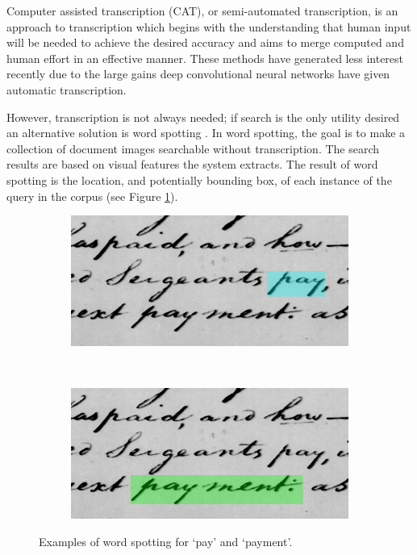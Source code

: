 \documentclass[ms,electronic,twosidetoc,letterpaper,chaptercenter,parttop,lof,lot]{byumsphd}
\begin{document}
Computer assisted transcription (CAT), or semi-automated transcription, is an approach to transcription which begins with the understanding that human input will be needed to achieve the desired accuracy and aims to merge computed and human effort in an effective manner. 
These methods have generated less interest recently due to the large gains deep convolutional neural networks have given automatic transcription.

However, transcription is not always needed; if search is the only utility desired an alternative solution is word spotting \cite{manmatha1996}. In word spotting, the goal is to make a collection of document images searchable without transcription. The search results are based on visual features the system extracts. The result of word spotting is the location, and potentially bounding box, of each instance of the query in the corpus (see Figure \ref{fig:explain_spotting}). 

\begin{figure}[t]
    \begin{subfigure}{0.46\textwidth}
    		\centering
    		\includegraphics[width=\textwidth]{spotting_explination_pay}
    	\end{subfigure}
    	~
    	\begin{subfigure}{0.46\textwidth}
    		\centering
    		\includegraphics[width=\textwidth]{spotting_explination_payment}
    	\end{subfigure}
    	\caption{Examples of word spotting for `pay' and `payment'.}
    	\label{fig:explain_spotting}
\end{figure}
\end{document}
